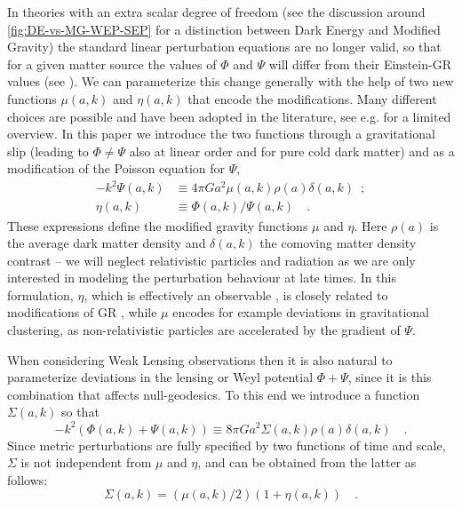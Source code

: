 In theories with an extra scalar degree of freedom (see the discussion around \cref{fig:DE-vs-MG-WEP-SEP} for a distinction between Dark Energy and Modified Gravity)
the standard linear perturbation equations
are no longer valid, so that for a given matter source the values
of $\Phi$ and $\Psi$ will differ from their Einstein-GR values (see \cite{kunz_phenomenological_2012, amendola_observables_2013}). We can
parameterize this change generally with the help of two new functions $\mu(a,k)$ and $\eta(a,k)$
that encode the modifications. Many different choices are possible
and have been adopted in the literature, see e.g. \cite{planck_collaboration_planck_2016} for a limited overview. 
In this paper
we introduce the two functions through a gravitational slip (leading
to $\Phi\neq\Psi$ also at linear order and for pure cold dark matter)
and as a modification of the Poisson equation for $\Psi$, 
\begin{align}
-k^{2}\Psi(a,k) & \equiv  4\pi
Ga^{2}\mu(a,k)\rho(a)\delta(a,k)\,\,\,;\label{eq:mu_def}\\
\eta(a,k) & \equiv \Phi(a,k)/\Psi(a,k) \quad \label{eq:eta_def}.
\end{align}
These expressions define the modified gravity functions
$\mu$ and $\eta$. Here $\rho(a)$ is the average dark matter density and $\delta(a,k)$
the comoving matter density contrast -- we will neglect relativistic
particles and radiation as we are only interested in modeling the
perturbation behaviour at late times. 
In this formulation, $\eta$,
which is effectively an observable \cite{amendola_observables_2013}, is closely related to
modifications of GR \cite{saltas_anisotropic_2014,sawicki_non-standard_2016}, 
while $\mu$ encodes for example deviations in
gravitational clustering, as non-relativistic particles are accelerated by the gradient of $\Psi$.

When considering Weak Lensing observations then it is also natural
to parameterize deviations in the lensing or Weyl potential $\Phi+\Psi$,
since it is this combination that affects null-geodesics.
To this end we introduce a function $\Sigma(a,k)$ so that
\begin{equation}\label{eq:Sigma-def}
-k^{2}(\Phi(a,k)+\Psi(a,k))\equiv8\pi
Ga^{2}\Sigma(a,k)\rho(a)\delta(a,k) \quad .
\end{equation}
Since metric perturbations are fully specified by two functions of
time and scale, $\Sigma$ is not independent from $\mu$ and $\eta$,
and can be obtained from the latter as follows: 
\begin{equation}\label{eq:SigmaofMuEta}
\Sigma(a,k)=(\mu(a,k)/2)(1+\eta(a,k)) \quad.
\end{equation}

